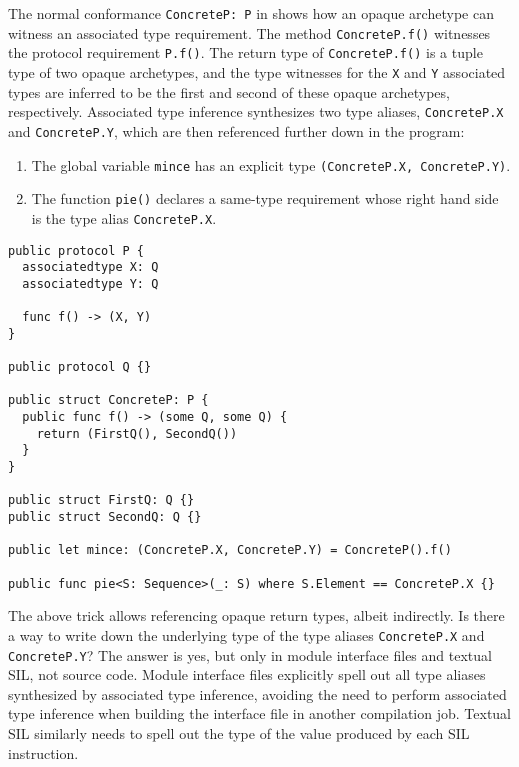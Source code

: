 \documentclass[../generics]{subfiles}
\begin{document}
\begin{example} The normal conformance \texttt{ConcreteP:\ P} in  shows how an opaque archetype can witness an associated type requirement. The method \texttt{ConcreteP.f()} witnesses the protocol requirement \texttt{P.f()}. The return type of \texttt{ConcreteP.f()} is a tuple type of two opaque archetypes, and the type witnesses for the \texttt{X} and \texttt{Y} associated types are inferred to be the first and second of these opaque archetypes, respectively. Associated type inference synthesizes two type aliases, \texttt{ConcreteP.X} and \texttt{ConcreteP.Y}, which are then referenced further down in the program:
\begin{enumerate}
\item The global variable \texttt{mince} has an explicit type \texttt{(ConcreteP.X,~ConcreteP.Y)}.
\item The function \texttt{pie()} declares a same-type requirement whose right hand side is the type alias \texttt{ConcreteP.X}.
\end{enumerate}

\begin{listing}\label{reference opaque return type}
\begin{Verbatim}
public protocol P {
  associatedtype X: Q
  associatedtype Y: Q
  
  func f() -> (X, Y)
}

public protocol Q {}

public struct ConcreteP: P {
  public func f() -> (some Q, some Q) {
    return (FirstQ(), SecondQ())
  }
}

public struct FirstQ: Q {}
public struct SecondQ: Q {}

public let mince: (ConcreteP.X, ConcreteP.Y) = ConcreteP().f()

public func pie<S: Sequence>(_: S) where S.Element == ConcreteP.X {}
\end{Verbatim}
\end{listing}
\end{example}

The above trick allows referencing opaque return types, albeit indirectly. Is there a way to write down the underlying type of the type aliases \texttt{ConcreteP.X} and \texttt{ConcreteP.Y}? The answer is yes, but only in module interface files and textual SIL, not source code. Module interface files explicitly spell out all type aliases synthesized by associated type inference, avoiding the need to perform associated type inference when building the interface file in another compilation job. Textual SIL similarly needs to spell out the type of the value produced by each SIL instruction.
\end{document}
